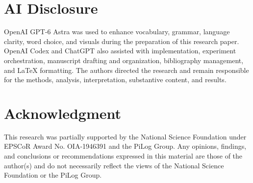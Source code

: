 \documentclass[conference,letterpaper]{IEEEtran}
\begin{document}
\section*{AI Disclosure}
OpenAI GPT-6 Astra was used to enhance vocabulary, grammar, language clarity, word choice, and visuals during the preparation of this research paper. OpenAI Codex and ChatGPT also assisted with implementation, experiment orchestration, manuscript drafting and organization, bibliography management, and LaTeX formatting. The authors directed the research and remain responsible for the methods, analysis, interpretation, substantive content, and results.

\section*{Acknowledgment}
This research was partially supported by the National Science Foundation under EPSCoR Award No. OIA-1946391 and the PiLog Group. Any opinions, findings, and conclusions or recommendations expressed in this material are those of the author(s) and do not necessarily reflect the views of the National Science Foundation or the PiLog Group.



\end{document}
